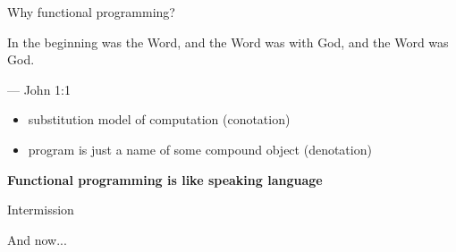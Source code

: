 \documentclass{beamer}
\begin{document}
{ %
  \begin{frame}[plain]
  \end{frame}
}

\begin{frame}{Why functional programming?}

  \begin{displayquote}
    In the beginning was the Word, and the Word was with God,
    and the Word was God.
  \end{displayquote}
  --- John 1:1
  \pause
  \begin{itemize}
  \item substitution model of computation (conotation)
    \pause
  \item program is just a name of some compound object (denotation)
  \end{itemize}
  \pause
  \textbf{Functional programming is like speaking language}
  
\end{frame}

\begin{frame}{Intermission}
  \begin{center}
    \begin{Huge}
      And now...
    \end{Huge}
  \end{center}
\end{frame}
\end{document}
